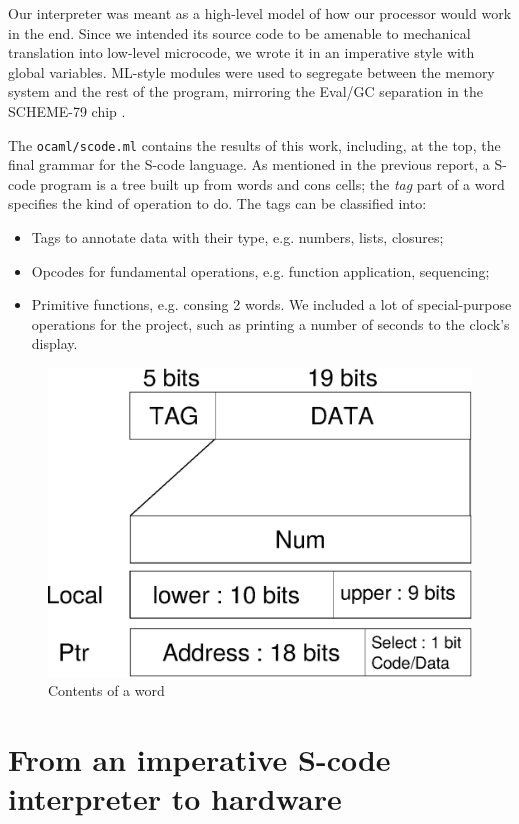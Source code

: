 \documentclass[a4paper, 11pt]{article}
\begin{document}
Our interpreter was meant as a high-level model of how our processor would work in the end. Since  we intended its source code to be amenable to mechanical translation into low-level microcode, we wrote it in an imperative style with global variables. ML-style modules were used to segregate between the memory system and the rest of the program, mirroring the Eval/GC separation in the SCHEME-79 chip \cite{SCHEME-79}.

The \texttt{ocaml/scode.ml} contains the results of this work, including, at the top, the final grammar for the S-code language. As mentioned in the previous report, a S-code program is a tree built up from words and cons cells; the \emph{tag} part of a word specifies the kind of operation to do. The tags can be classified into:
\begin{itemize}
\item Tags to annotate data with their type, e.g. numbers, lists, closures;
\item Opcodes for fundamental operations, e.g. function application, sequencing;
\item Primitive functions, e.g. consing 2 words. We included a lot of special-purpose operations for the project, such as printing a number of seconds to the clock's display.
\end{itemize}


\begin{figure}[h]
\center
\caption{Contents of a word}
   \includegraphics[scale=0.5]{words.eps}
\end{figure}


\section{From an imperative S-code interpreter to hardware}
\end{document}
